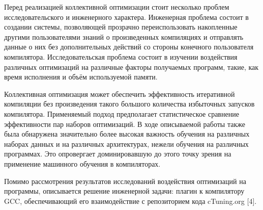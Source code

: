 Перед реализацией коллективной оптимизации стоит несколько проблем исследовательского и инженерного характера. Инженерная проблема состоит в создании системы, позволяющей прозрачно переиспользовать накопленные другими пользователями знаний о произведенных компиляциях и отправлять данные о них без дополнительных действий со стороны конечного пользователя компилятора. Исследовательская проблема состоит в изучении воздействия различных оптимизаций на различные факторы получаемых программ, такие, как время исполнения и объём используемой памяти.

Коллективная оптимизация может обеспечить эффективность итеративной компиляции без произведения такого большого количества избыточных запусков компилятора. Применяемый подход предполагает статистическое сравнение эффективности пар наборов оптимизаций. В ходе описываемой работы также была обнаружена значительно более высокая важность обучения на различных наборах данных и на различных архитектурах, нежели обучения на различных программах. Это опровергает доминировавшую до этого точку зрения на применение машинного обучения в компиляторах.

Помимо рассмотрения результатов исследований воздействия оптимизаций на программы, описывается решение инженерной задачи: плагин к компилятору GCC, обеспечивающий его взаимодействие с репозиторием кода cTuning.org [4].